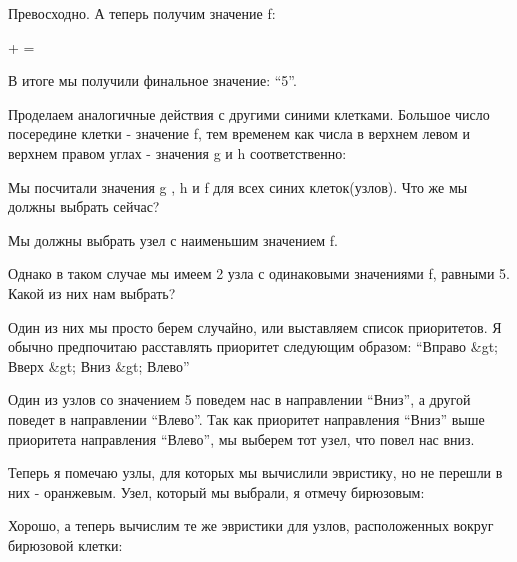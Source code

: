 Превосходно. А теперь получим значение f: \begin{tcolorbox}  +  =  \end{tcolorbox}

\vspace{\baselineskip}

В итоге мы получили финальное значение: “5”.

\vspace{\baselineskip}

Проделаем аналогичные действия с другими синими клетками. Большое число посередине клетки - значение f, тем временем как числа в верхнем левом и верхнем правом углах - значения g и h соответственно:



Мы посчитали значения g , h и f для всех синих клеток(узлов). Что же мы должны выбрать сейчас?

\vspace{\baselineskip}

Мы должны выбрать узел с наименьшим значением f.

\vspace{\baselineskip}

Однако в таком случае мы имеем 2 узла с одинаковыми значениями f, равными 5. Какой из них нам выбрать?

\vspace{\baselineskip}

Один из них мы просто берем случайно, или выставляем список приоритетов. Я обычно предпочитаю расставлять приоритет следующим образом: “Вправо \&gt; Вверх \&gt; Вниз \&gt; Влево”

\vspace{\baselineskip}

Один из узлов со значением 5 поведем нас в направлении “Вниз”, а другой поведет в направлении “Влево”. Так как приоритет направления “Вниз” выше приоритета направления “Влево”, мы выберем тот узел, что повел нас вниз.

\vspace{\baselineskip}

Теперь я помечаю узлы, для которых мы вычислили эвристику, но не перешли в них - оранжевым. Узел, который мы выбрали, я отмечу бирюзовым:

\newpage


Хорошо, а теперь вычислим те же эвристики для узлов, расположенных вокруг бирюзовой клетки:


